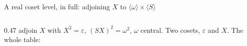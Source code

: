 \begin{frame}{A real coset level, in full: adjoining $X$ to $\langle\omega\rangle\times\langle S\rangle$ \InPaper}
\begin{columns}[T]
\begin{column}{0.47\textwidth}
adjoin $X$ with $X^2=\varepsilon$, $(SX)^2=\omega^2$, $\omega$ central.
Two cosets, $\varepsilon$ and $X$. The whole table:
\begin{code}%
%
\>[2]\AgdaSpace{}%
\AgdaSymbol{:}\AgdaSpace{}%
\AgdaSpace{}%
\AgdaSpace{}%
\AgdaSpace{}%
\AgdaSpace{}%
\AgdaSpace{}%
\AgdaSpace{}%
\AgdaSpace{}%
\<%
\\
%
\>[2]\AgdaSpace{}%
\AgdaSpace{}%
\AgdaSpace{}%
\AgdaSymbol{=}\AgdaSpace{}%
\AgdaSpace{}%
\AgdaOperator{\AgdaInductiveConstructor{,}}\AgdaSpace{}%
\<%
\\
%
\>[2]\AgdaSpace{}%
\AgdaSpace{}%
\AgdaSpace{}%
\AgdaSymbol{=}\AgdaSpace{}%
\AgdaSymbol{(}\AgdaSpace{}%
\AgdaOperator{\AgdaPostulate{\textasciicircum{}}}\AgdaSpace{}%
\AgdaSpace{}%
\AgdaSpace{}%
\AgdaSpace{}%
\AgdaOperator{\AgdaPostulate{\textasciicircum{}}}\AgdaSpace{}%
\AgdaSymbol{)}\AgdaSpace{}%
\AgdaOperator{\AgdaInductiveConstructor{,}}\AgdaSpace{}%
\<%
\\
%
\>[2]\AgdaSpace{}%
\AgdaSpace{}%
\AgdaSpace{}%
\AgdaSymbol{=}\AgdaSpace{}%
\AgdaSpace{}%
\AgdaOperator{\AgdaInductiveConstructor{,}}\AgdaSpace{}%
\<%
\\
%
\>[2]\AgdaSpace{}%
\AgdaSpace{}%
\AgdaSpace{}%
\AgdaSymbol{=}\AgdaSpace{}%
\AgdaSpace{}%
\AgdaOperator{\AgdaInductiveConstructor{,}}\AgdaSpace{}%
\<%
\\
%
\>[2]\AgdaSpace{}%
\AgdaSpace{}%
\AgdaSpace{}%
\AgdaSymbol{=}\AgdaSpace{}%
\AgdaSpace{}%
\AgdaOperator{\AgdaInductiveConstructor{,}}\AgdaSpace{}%
\<%
\\
%
\>[2]\AgdaSpace{}%
\AgdaSpace{}%
\AgdaSpace{}%

\end{code}
\end{column}
\end{columns}
\end{frame}
